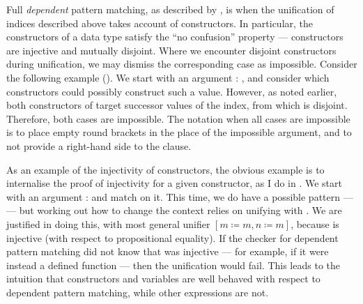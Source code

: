 Full \emph{dependent} pattern matching, as described by \citet{MM04}, is when
the unification of indices described above takes account of constructors.
In particular, the constructors of a data type satisfy the ``no confusion''
property --- constructors are injective and mutually disjoint.
Where we encounter disjoint constructors during unification, we may dismiss the
corresponding case as impossible.
Consider the following example ().
We start with an argument
\AgdaSpace{}\AgdaSymbol:\AgdaSpace{}\AgdaSpace{}%
, and consider which constructors could possibly
construct such a value.
However, as noted earlier, both constructors of  target
successor values of the index, from which  is
disjoint.
Therefore, both cases are impossible.
The notation when all cases are impossible is to place empty round brackets
\AgdaSymbol{()} in the place of the impossible argument, and to not provide a
right-hand side to the clause.


As an example of the injectivity of constructors, the obvious example is to
internalise the proof of injectivity for a given constructor, as I do in
.
We start with an argument
\AgdaSpace{}\AgdaSymbol:\AgdaSpace{}%
\AgdaSpace{}%
\AgdaSpace{}\AgdaOperator{\AgdaDatatype{$\equiv$}}\AgdaSpace{}%
\AgdaSpace{}
and match on it.
This time, we do have a possible pattern ---  ---
but working out how to change the context relies on unifying
\AgdaSpace{} with
\AgdaSpace{}.
We are justified in doing this, with most general unifier
$[m \coloneqq m, n \coloneqq m]$, because  is
injective (with respect to propositional equality).
If the checker for dependent pattern matching did not know that
 was injective --- for example, if it were instead
a defined function --- then the unification would fail.
This leads to the intuition that constructors and variables are well behaved
with respect to dependent pattern matching, while other expressions are not.


